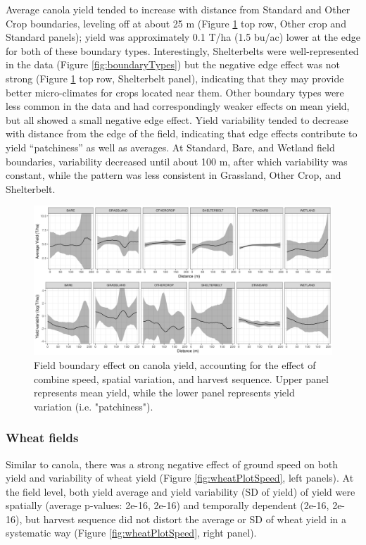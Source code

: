 \documentclass[]{elsarticle} %
\begin{document}
Average canola yield tended to increase with distance from Standard and Other Crop boundaries, leveling off at about 25 m (Figure \ref{fig:canolaPlot} top row, Other crop and Standard panels); yield was approximately 0.1 T/ha (1.5 bu/ac) lower at the edge for both of these boundary types.
Interestingly, Shelterbelts were well-represented in the data (Figure \ref{fig:boundaryTypes}) but the negative edge effect was not strong (Figure \ref{fig:canolaPlot} top row, Shelterbelt panel), indicating that they may provide better micro-climates for crops located near them.
Other boundary types were less common in the data and had correspondingly weaker effects on mean yield, but all showed a small negative edge effect.
Yield variability tended to decrease with distance from the edge of the field, indicating that edge effects contribute to yield ``patchiness'' as well as averages.
At Standard, Bare, and Wetland field boundaries, variability decreased until about 100 m, after which variability was constant, while the pattern was less consistent in Grassland, Other Crop, and Shelterbelt.

\begin{figure}
\includegraphics[width=1\linewidth]{../Figures/ModelSummary3a_canola} \caption{Field boundary effect on canola yield, accounting for the effect of combine speed, spatial variation, and harvest sequence. Upper panel represents mean yield, while the lower panel represents yield variation (i.e. "patchiness").}\label{fig:canolaPlot}
\end{figure}

\hypertarget{wheat-fields}{%
\subsubsection{Wheat fields}\label{wheat-fields}}

Similar to canola, there was a strong negative effect of ground speed on both yield and variability of wheat yield (Figure \ref{fig:wheatPlotSpeed}, left panels).
At the field level, both yield average and yield variability (SD of yield) of yield were spatially (average p-values: 2e-16, 2e-16) and temporally dependent (2e-16, 2e-16), but harvest sequence did not distort the average or SD of wheat yield in a systematic way (Figure \ref{fig:wheatPlotSpeed}, right panel).
\end{document}
